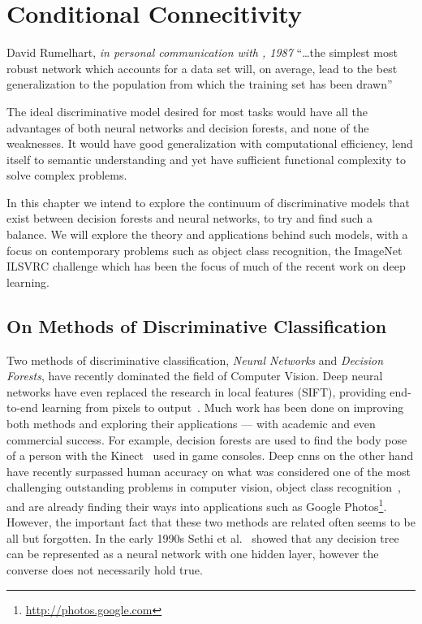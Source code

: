 \documentclass[thesis]{subfiles}
\begin{document}
	\chapter{Conditional Connecitivity}\label{conditionalnetworks}
	\begin{chapquote}{David Rumelhart, \textit{in personal communication with \citet{hanson1989comparing}, 1987}}
		``\ldots the simplest most robust network which accounts for a data set will, on average, lead to the best generalization to the population from which the training set has been drawn''
	\end{chapquote}
	
	The ideal discriminative model desired for most tasks would have all the advantages of both neural networks and decision forests, and none of the weaknesses. It would have good generalization with computational efficiency, lend itself to semantic understanding and yet have sufficient functional complexity to solve complex problems. 
	
	In this chapter we intend to explore the continuum of discriminative models that exist between decision forests and neural networks, to try and find such a balance. We will explore the theory and applications behind such models, with a focus on contemporary problems such as object class recognition, \ie the ImageNet ILSVRC challenge which has been the focus of much of the recent work on deep learning.
	
	\section{On Methods of Discriminative Classification}
	
	Two methods of discriminative classification, \emph{Neural Networks} and \emph{Decision Forests}, have recently dominated the field of Computer Vision. Deep neural networks have even replaced the research in local features (\eg SIFT), providing end-to-end learning from pixels to output~\citep{yi2016lift}. Much work has been done on improving both methods and exploring their applications --- with academic and even commercial success. For example, decision forests are used to find the body pose of a person with the Kinect~\citep{conf/cvpr/ShottonFCSFMKB11} used in game consoles. Deep \glspl{cnn} on the other hand have recently surpassed human accuracy on what was considered one of the most challenging outstanding problems in computer vision, object class recognition~\citep{He2015b}, and are already finding their ways into applications such as Google Photos\footnote{\href{http://photos.google.com}{http://photos.google.com}}. However, the important fact that these two methods are related often seems to be all but forgotten. In the early 1990s Sethi et al.~\citep{Sethi1990} showed that any decision tree can be represented as a neural network with one hidden layer, however the converse does not necessarily hold true.
	
\end{document}

